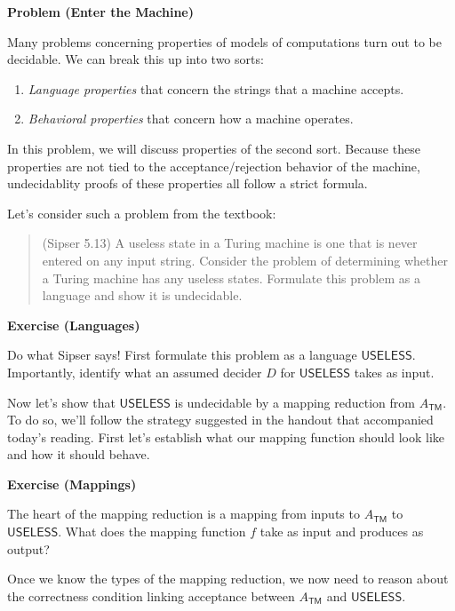 \documentclass[12pt]{article}
\newenvironment{exercise}[1]{%
  \begin{shaded}
  \noindent\textbf{Exercise (#1)}\quad
}{\end{shaded}}
\newcounter{ProblemCounter}
\newenvironment{problem}[1][]
  {\refstepcounter{ProblemCounter}\noindent\textbf{Problem \theProblemCounter{} (#1)}\quad}
  {\newpage}
\newcommand{\prob}[1]{\ensuremath{\textsf{#1}}\xspace}
\newcommand{\Atm}{\ensuremath{A_\mathsf{TM}}\xspace}
\begin{document}

\begin{problem}[Enter the Machine]

Many problems concerning properties of models of computations turn out to be
decidable.  We can break this up into two sorts:
\begin{enumerate}
  \item \emph{Language properties} that concern the strings that a machine
    accepts.
  \item \emph{Behavioral properties} that concern how a machine operates.
\end{enumerate}
In this problem, we will discuss properties of the second sort.  Because these
properties are not tied to the acceptance/rejection behavior of the machine,
undecidablity proofs of these properties all follow a strict formula.

Let's consider such a problem from the textbook:
\begin{quote}
  (Sipser 5.13) A useless state in a Turing machine is one that is never
  entered on any input string.  Consider the problem of determining whether a
  Turing machine has any useless states.  Formulate this problem as a language
  and show it is undecidable.
\end{quote}

\begin{exercise}{Languages}
  Do what Sipser says!  First formulate this problem as a language
  \prob{USELESS}.  Importantly, identify what an assumed decider \( D \) for
  \prob{USELESS} takes as input.
\end{exercise}

Now let's show that \prob{USELESS} is undecidable by a mapping reduction from
\Atm.  To do so, we'll follow the strategy suggested in the handout that
accompanied today's reading.  First let's establish what our mapping function
should look like and how it should behave.

\begin{exercise}{Mappings}
  The heart of the mapping reduction is a mapping from inputs to \Atm to
  \prob{USELESS}.  What does the mapping function \( f \) take as input and
  produces as output?
\end{exercise}

Once we know the types of the mapping reduction, we now need to reason about
the correctness condition linking acceptance between \Atm and \prob{USELESS}.


\end{problem}
\end{document}
